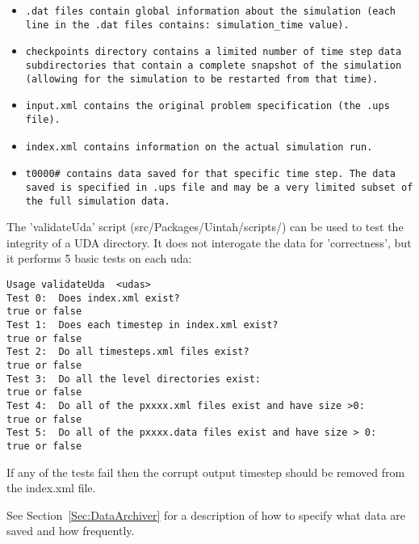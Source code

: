 \begin{itemize}

\item \tt.dat \normalfont files contain global information about the
  simulation (each line in the .dat files contains: simulation\_time
  value).
\item \tt checkpoints \normalfont directory contains a limited
  number of time step data subdirectories that contain a complete
  snapshot of the simulation (allowing for the simulation to be
  restarted from that time).
\item \tt input.xml \normalfont contains the original problem
  specification (the .ups file).
\item \tt index.xml \normalfont contains information on the actual
  simulation run.
\item \tt t0000\# \normalfont contains data saved for that specific
  time step.  The data saved is specified in .ups file and may be a
  very limited subset of the full simulation data.

\end{itemize}

The 'validateUda' script (src/Packages/Uintah/scripts/) can be used to
test the integrity of a UDA directory. It does not interogate the data
for 'correctness', but it performs 5 basic tests on each uda:

\begin{Verbatim}
Usage validateUda  <udas>
Test 0:  Does index.xml exist?                                        true or false
Test 1:  Does each timestep in index.xml exist?                       true or false
Test 2:  Do all timesteps.xml files exist?                            true or false
Test 3:  Do all the level directories exist:                          true or false
Test 4:  Do all of the pxxxx.xml files exist and have size >0:        true or false
Test 5:  Do all of the pxxxx.data files exist and have size > 0:      true or false
\end{Verbatim}

If any of the tests fail then the corrupt output timestep should be removed from the index.xml file.


See Section~\ref{Sec:DataArchiver} for a description of how to specify
what data are saved and how frequently.




